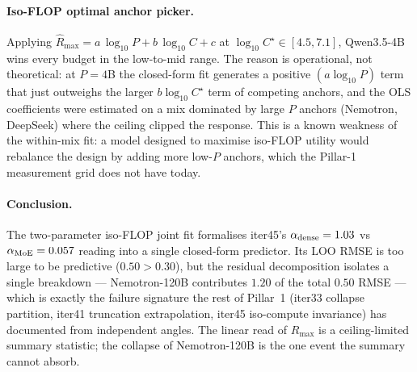 \paragraph{Iso-FLOP optimal anchor picker.}
Applying $\hat{R}_{\max}=a\,\log_{10}P + b\,\log_{10}C + c$ at $\log_{10}C^{\star}\in[4.5,7.1]$, Qwen3.5-4B wins every budget in the low-to-mid range. The reason is operational, not theoretical: at $P=4$B the closed-form fit generates a positive $(a \log_{10} P)$ term that just outweighs the larger $b\log_{10}C^{\star}$ term of competing anchors, and the OLS coefficients were estimated on a mix dominated by large $P$ anchors (Nemotron, DeepSeek) where the ceiling clipped the response. This is a known weakness of the within-mix fit: a model designed to maximise iso-FLOP utility would rebalance the design by adding more low-$P$ anchors, which the Pillar-1 measurement grid does not have today.

\paragraph{Conclusion.}
The two-parameter iso-FLOP joint fit formalises iter45's $\alpha_{\rm dense}=1.03$ vs $\alpha_{\rm MoE}=0.057$ reading into a single closed-form predictor. Its LOO RMSE is too large to be predictive ($0.50 > 0.30$), but the residual decomposition isolates a single breakdown --- Nemotron-120B contributes $1.20$ of the total $0.50$ RMSE --- which is exactly the failure signature the rest of Pillar~1 (iter33 collapse partition, iter41 truncation extrapolation, iter45 iso-compute invariance) has documented from independent angles. The linear read of $R_{\max}$ is a ceiling-limited summary statistic; the collapse of Nemotron-120B is the one event the summary cannot absorb.

